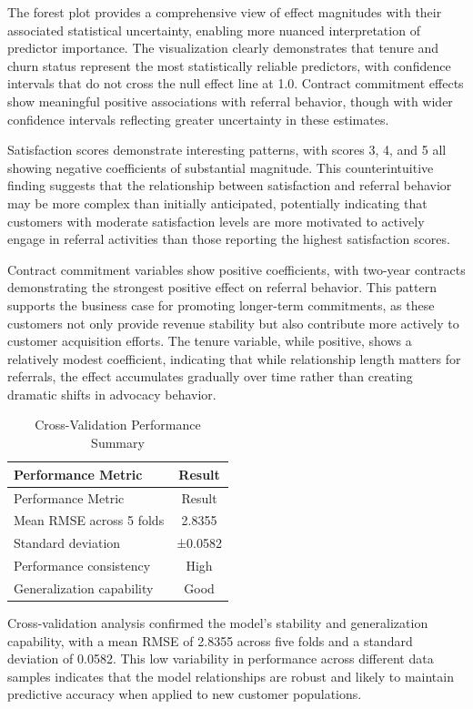 \documentclass[
]{article}
\begin{document}
The forest plot provides a comprehensive view of effect magnitudes with
their associated statistical uncertainty, enabling more nuanced
interpretation of predictor importance. The visualization clearly
demonstrates that tenure and churn status represent the most
statistically reliable predictors, with confidence intervals that do not
cross the null effect line at 1.0. Contract commitment effects show
meaningful positive associations with referral behavior, though with
wider confidence intervals reflecting greater uncertainty in these
estimates.

Satisfaction scores demonstrate interesting patterns, with scores 3, 4,
and 5 all showing negative coefficients of substantial magnitude. This
counterintuitive finding suggests that the relationship between
satisfaction and referral behavior may be more complex than initially
anticipated, potentially indicating that customers with moderate
satisfaction levels are more motivated to actively engage in referral
activities than those reporting the highest satisfaction scores.

Contract commitment variables show positive coefficients, with two-year
contracts demonstrating the strongest positive effect on referral
behavior. This pattern supports the business case for promoting
longer-term commitments, as these customers not only provide revenue
stability but also contribute more actively to customer acquisition
efforts. The tenure variable, while positive, shows a relatively modest
coefficient, indicating that while relationship length matters for
referrals, the effect accumulates gradually over time rather than
creating dramatic shifts in advocacy behavior.

\begin{longtable}[]{@{}lc@{}}
\caption{Cross-Validation Performance Summary}\tabularnewline
\toprule\noalign{}
Performance Metric & Result \\
\midrule\noalign{}
\endfirsthead
\toprule\noalign{}
Performance Metric & Result \\
\midrule\noalign{}
\endhead
\bottomrule\noalign{}
\endlastfoot
Mean RMSE across 5 folds & 2.8355 \\
Standard deviation & ±0.0582 \\
Performance consistency & High \\
Generalization capability & Good \\
\end{longtable}

Cross-validation analysis confirmed the model's stability and
generalization capability, with a mean RMSE of 2.8355 across five folds
and a standard deviation of 0.0582. This low variability in performance
across different data samples indicates that the model relationships are
robust and likely to maintain predictive accuracy when applied to new
customer populations.
\end{document}
